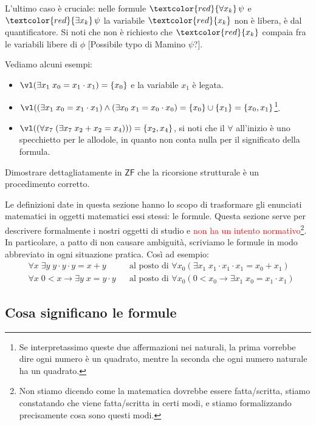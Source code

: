 \begin{remark}
    L'ultimo caso è cruciale: nelle formule $\textcolor{red}{\forall x_k} \, \psi$ e $\textcolor{red}{\exists x_k} \, \psi$ la variabile $\textcolor{red}{x_k}$ non è libera, è  dal quantificatore.
    Si noti che non è richiesto che $\textcolor{red}{x_k}$ compaia fra le variabili libere di $\phi$ [Possibile typo di Mamino $\psi$?].
\end{remark}

\begin{example}
    Vediamo alcuni esempi:
    \begin{itemize}[$\diamondsuit$]
        \item $\vl(\exists x_1 \; x_0 = x_1 \cdot x_1) = \{x_0\}$ e la variabile $x_1$ è legata.
        \item $\vl((\exists x_1 \; x_0 = x_1 \cdot x_1) \land (\exists x_0 \; x_1 = x_0 \cdot x_0) = \{x_0\} \cup \{x_1\} = \{x_0,x_1\}$\footnote{Se interpretassimo queste due affermazioni nei naturali, la prima vorrebbe dire ogni numero è un quadrato, mentre la seconda che ogni numero naturale ha un quadrato.}.
        \item $\vl((\forall x_7 \; (\exists x_7 \; x_2 + x_2 = x_4))) = \{x_2,x_4\}$, si noti che il $\forall$ all'inizio è uno specchietto per le allodole, in quanto non conta nulla per il significato della formula.
    \end{itemize}
\end{example}

\begin{exercise}
    Dimostrare dettagliatamente in $\mathsf{ZF}$ che la ricorsione strutturale è un procedimento corretto.
\end{exercise}

\begin{note}
    Le definizioni date in questa sezione hanno lo scopo di trasformare gli enunciati matematici in oggetti matematici essi stessi: le formule.
    Questa sezione serve per descrivere formalmente i nostri oggetti di studio e \textcolor{red}{non ha un intento normativo}\footnote{Non stiamo dicendo come 
    la matematica dovrebbe essere fatta/scritta, stiamo constatando che viene fatta/scritta in certi modi, e stiamo formalizzando precisamente cosa sono questi modi.}.
    In particolare, a patto di non causare ambiguità, scriviamo le formule in modo abbreviato in ogni situazione pratica. Così ad esempio:
    \begin{align*}
        &\forall x\; \exists y \; y \cdot y \cdot y = x + y &&\text{al posto di  $\forall x_0(\exists x_1 \; x_1 \cdot x_1 \cdot x_1 = x_0 + x_1)$} \\
        &\forall x\; 0 < x \to \exists y \; x = y \cdot y &&\text{al posto di $\forall x_0(0 < x_0 \to \exists x_1 \; x_0 = x_1 \cdot x_1)$}
    \end{align*}
\end{note}

\subsection{Cosa significano le formule}